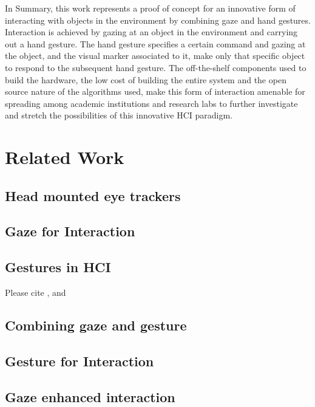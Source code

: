 \documentclass[jou,a4paper,notxfonts]{apa}
\begin{document}
In Summary, this work represents a proof of concept for an innovative form of interacting with objects in the
environment by combining gaze and hand gestures. Interaction is achieved by gazing at an object in the environment and
carrying out a hand gesture. The hand gesture specifies a certain command and gazing at the object, and the visual
marker associated to it, make only that specific object to respond to the subsequent hand gesture. The off-the-shelf components
used to build the hardware, the low cost of building the entire system and the open source nature of the algorithms
used, make this form of interaction amenable for spreading among academic institutions and research labs to further
investigate and stretch the possibilities of this innovative HCI paradigm.


\section{Related Work}
\subsection{Head mounted eye trackers}

\subsection{Gaze for Interaction}
\subsection{Gestures in HCI}
Please cite \cite{Rozado2012a}, \cite{mardanbegi2012eye} and \cite{Rozado2012} 

\subsection{Combining gaze and gesture}
\subsection{Gesture for Interaction}
%
\subsection{Gaze enhanced interaction }
\end{document}
